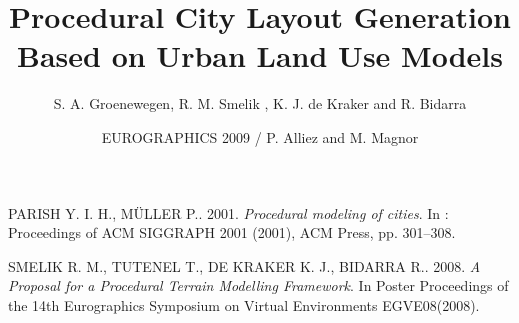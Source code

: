 \documentclass[11pt]{article}
\title{Procedural City Layout Generation Based on Urban Land Use Models}
\author{S. A. Groenewegen, R. M. Smelik , K. J. de Kraker and R. Bidarra}
\date{EUROGRAPHICS 2009 / P. Alliez and M. Magnor}
\begin{document}
\maketitle

\begin{thebibliography}{2} 

PARISH Y. I. H., MÜLLER P.. 2001.
\textit{Procedural modeling of cities}.
In : Proceedings of ACM SIGGRAPH 2001 (2001), ACM Press, pp. 301–308.

SMELIK R. M., TUTENEL T., DE KRAKER K. J., BIDARRA R.. 2008.
\textit{A Proposal for a Procedural Terrain Modelling Framework}.
In Poster Proceedings of the 14th Eurographics Symposium on Virtual Environments EGVE08(2008).

\end{thebibliography}
\end{document}
